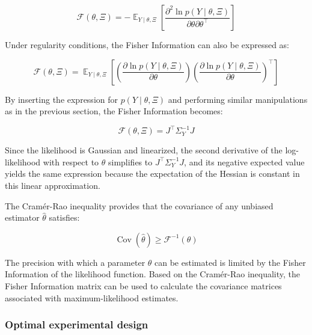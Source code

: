 \documentclass[../Article_Design_of_Experiment.tex]{subfiles}
\begin{document}
	{\footnotesize \begin{equation} \mathcal{F}(\theta, \Xi) = -\mathop{\mathbb{E}}_{Y \mid \theta, \Xi} \left[ \frac{\partial^2 \ln p \left( Y \mid \theta, \Xi \right)}{\partial \theta \partial \theta^\top} \right] \end{equation} }
	
	Under regularity conditions, the Fisher Information can also be expressed as:
	
	{\footnotesize \begin{equation} \mathcal{F}(\theta, \Xi) = \mathop{\mathbb{E}}_{Y \mid \theta, \Xi} \left[ \left( \frac{\partial \ln p\left( Y \mid \theta, \Xi \right)}{\partial \theta} \right) \left( \frac{\partial \ln p\left( Y \mid \theta, \Xi \right)}{\partial \theta} \right)^\top \right] \end{equation} }
	
	By inserting the expression for $p\left( Y \mid \theta, \Xi \right)$ and performing similar manipulations as in the previous section, the Fisher Information becomes:
	
	{\footnotesize \begin{equation} \mathcal{F}(\theta, \Xi) = J^\top \Sigma_Y^{-1} J \end{equation} }
	
	Since the likelihood is Gaussian and linearized, the second derivative of the log-likelihood with respect to $\theta$ simplifies to $J^\top \Sigma_Y^{-1} J$, and its negative expected value yields the same expression because the expectation of the Hessian is constant in this linear approximation.

	The Cramér-Rao inequality provides that the covariance of any unbiased estimator $\hat{\theta}$ satisfies:
	
	{\footnotesize \begin{equation} \operatorname{Cov}(\hat{\theta}) \geq \mathcal{F}^{-1}(\theta) \end{equation} }
	
	The precision with which a parameter $\theta$ can be estimated is limited by the Fisher Information of the likelihood function. Based on the Cramér-Rao inequality, the Fisher Information matrix can be used to calculate the covariance matrices associated with maximum-likelihood estimates.
	
	\subsubsection{Optimal experimental design}
	
\end{document}
